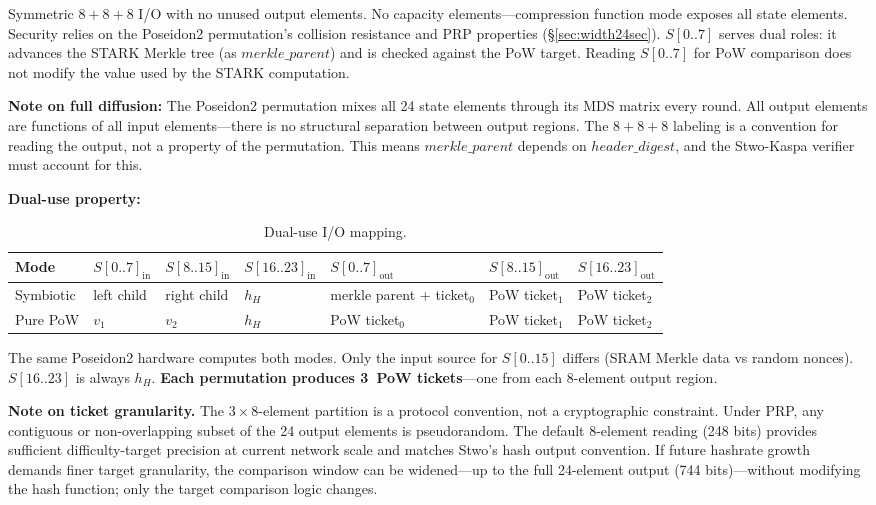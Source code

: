 \documentclass[11pt,a4paper]{article}
\begin{document}
Symmetric $8{+}8{+}8$ I/O with no unused output elements. No capacity elements---compression function mode exposes all state elements. Security relies on the Poseidon2 permutation's collision resistance and PRP properties (\S\ref{sec:width24sec}). $S[0..7]$ serves dual roles: it advances the STARK Merkle tree (as $\mathit{merkle\_parent}$) and is checked against the PoW target. Reading $S[0..7]$ for PoW comparison does not modify the value used by the STARK computation.

\textbf{Note on full diffusion:} The Poseidon2 permutation mixes all 24 state elements through its MDS matrix every round. All output elements are functions of all input elements---there is no structural separation between output regions. The $8{+}8{+}8$ labeling is a convention for reading the output, not a property of the permutation. This means $\mathit{merkle\_parent}$ depends on $\mathit{header\_digest}$, and the Stwo-Kaspa verifier must account for this.

\textbf{Dual-use property:}

\begin{table}[h]
\centering
\small
\begin{tabular}{@{}lllllll@{}}
\toprule
Mode & $S[0..7]_{\mathrm{in}}$ & $S[8..15]_{\mathrm{in}}$ & $S[16..23]_{\mathrm{in}}$ & $S[0..7]_{\mathrm{out}}$ & $S[8..15]_{\mathrm{out}}$ & $S[16..23]_{\mathrm{out}}$ \\
\midrule
Symbiotic & left child & right child & $h_H$ & merkle parent + ticket$_0$ & PoW ticket$_1$ & PoW ticket$_2$ \\
Pure PoW & $v_1$ & $v_2$ & $h_H$ & PoW ticket$_0$ & PoW ticket$_1$ & PoW ticket$_2$ \\
\bottomrule
\end{tabular}
\caption{Dual-use I/O mapping.}
\label{tab:dual-use}
\end{table}

The same Poseidon2 hardware computes both modes. Only the input source for $S[0..15]$ differs (SRAM Merkle data vs random nonces). $S[16..23]$ is always $h_H$. \textbf{Each permutation produces 3~PoW tickets}---one from each 8-element output region.

\textbf{Note on ticket granularity.} The $3 \times 8$-element partition is a protocol convention, not a cryptographic constraint. Under PRP, any contiguous or non-overlapping subset of the 24 output elements is pseudorandom. The default 8-element reading (248 bits) provides sufficient difficulty-target precision at current network scale and matches Stwo's hash output convention. If future hashrate growth demands finer target granularity, the comparison window can be widened---up to the full 24-element output (744 bits)---without modifying the hash function; only the target comparison logic changes.
\end{document}
